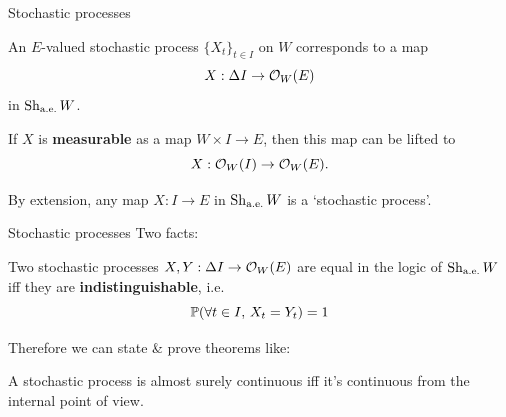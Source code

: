\begin{frame}{Stochastic processes}
	\begin{theorem}
		An $E$-valued stochastic process $\{X_t\}_{t \in I}$ on $W$ corresponds to a map
		\begin{equation*}
			X:\Delta I \to \O_W(E)
		\end{equation*}
		in $\Sh_\aetop W$.
	\end{theorem}

	\vfill
	If $X$ is \textbf{measurable} as a map $W \times I \to E$, then this map can be lifted to
	\begin{equation*}
		X : \O_W(I) \to \O_W(E).
	\end{equation*}

	\vfill
	By extension, any map $X:I \to E$ in $\Sh_\aetop W$ is a `stochastic process'.

\end{frame}

\begin{frame}{Stochastic processes}
	Two facts:
	\vfill
	\begin{theorem}
		Two stochastic processes $X, Y : \Delta I \to \O_W(E)$ are equal in the logic of $\Sh_\aetop W$ iff they are \textbf{indistinguishable}, i.e.
		\begin{equation*}
			\P( \forall t \in I,\, X_t = Y_t) = 1
		\end{equation*}
		\vspace{-3ex}
	\end{theorem}

	Therefore we can state \& prove theorems like:

	\vfill
	\begin{theorem}
		A stochastic process is almost surely continuous iff it's continuous from the internal point of view.
	\end{theorem}
\end{frame}


